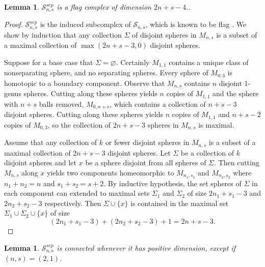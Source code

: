 \documentclass[11pt]{article}
\newtheorem{lemma}[theorem]{Lemma}
\theoremstyle{remark}
\theoremstyle{definition}
\begin{document}
\begin{lemma}
\label{sepflagdim}
$\mathcal {S}^{sep}_{n,s}$ is a flag complex of dimension $2n+s-4$..\\
\end{lemma}
\begin{proof}
$\mathcal {S}^{sep}_{n,s}$ is the induced subcomplex of $\mathcal {S}_{n,s}$,
which is known to be flag \cite{souto}.
We show by induction that any collection $\Sigma$ of disjoint spheres
in $M_{n,s}$
is a subset of a
maximal collection of $\max(2n+s-3,0)$ disjoint spheres.

Suppose for a base case that $\Sigma = \varnothing$.
Certainly $M_{1,1}$ contains a unique class of nonseparating sphere, and no separating spheres.
Every sphere of  $M_{0,3}$ is homotopic to a boundary component.
Observe that $M_{n,s}$ contains $n$ disjoint 1-genus spheres.
Cutting along these spheres yields $n$ copies of $M_{1,1}$ and
the sphere with $n+s$ balls removed, $M_{0,n+s}$,
which contains a collection of $n+s-3$ disjoint spheres.
Cutting along these spheres yields $n$ copies of $M_{1,1}$ and
$n+s-2$ copies of $M_{0,3}$, so the collection of $2n+s-3$
spheres in $M_{n,s}$
is maximal.

Assume that any collection of $k$ or fewer disjoint spheres in $M_{n,s}$ is a subset of a
maximal collection of $2n+s-3$ disjoint spheres.
Let $\Sigma$ be a collection of $k$ disjoint spheres and let $x$
be a sphere disjoint from all spheres of $\Sigma$.
Then cutting $M_{n,s}$ along $x$ yields two components
homeomorphic to
$M_{n_1,s_1}$ and $M_{n_2,s_2}$ where $n_1+n_2 =n$ and $s_1+s_2=s+2$.
By inductive hypothesis, the set spheres of $\Sigma$ in each component can
extended to maximal sets $\Sigma_1$ and $\Sigma_2$ of size
$2n_1+s_1-3$
and
$2n_2+s_2-3$
respectively.
Then $\Sigma \cup \{x\}$ is contained in the maximal set
$\Sigma_1 \cup \Sigma_2 \cup \{x\}$ of size
$$
(2n_1+s_1-3) + (2n_2+s_2-3) + 1 =2n+s-3.
$$
\end{proof}


\begin{lemma}
  $\mathcal {S}^{sep}_{n,s}$ is connected
whenever it has positive dimension, except if
$(n,s)=(2,1)$.
\end{lemma}
\end{document}
